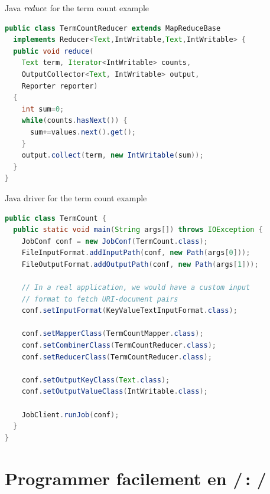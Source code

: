 \begin{frame}[fragile]{Java $\mathop{\mathit{reduce}}$ for the term count example}
\begin{lstlisting}[language=java]
public class TermCountReducer extends MapReduceBase
  implements Reducer<Text,IntWritable,Text,IntWritable> {
  public void reduce(
    Text term, Iterator<IntWritable> counts,
    OutputCollector<Text, IntWritable> output,
    Reporter reporter)
  {
    int sum=0;
    while(counts.hasNext()) {
      sum+=values.next().get();
    }
    output.collect(term, new IntWritable(sum));
  }
}
\end{lstlisting}
\end{frame}

\begin{frame}[fragile]{Java driver for the term count example}
\lstset{basicstyle=\footnotesize\ttfamily}
\begin{lstlisting}[language=java]
public class TermCount {
  public static void main(String args[]) throws IOException {
    JobConf conf = new JobConf(TermCount.class);
    FileInputFormat.addInputPath(conf, new Path(args[0]));
    FileOutputFormat.addOutputPath(conf, new Path(args[1]));

    // In a real application, we would have a custom input
    // format to fetch URI-document pairs
    conf.setInputFormat(KeyValueTextInputFormat.class);

    conf.setMapperClass(TermCountMapper.class);
    conf.setCombinerClass(TermCountReducer.class);
    conf.setReducerClass(TermCountReducer.class);

    conf.setOutputKeyClass(Text.class);
    conf.setOutputValueClass(IntWritable.class);

    JobClient.runJob(conf);
  }
}
\end{lstlisting}

\end{frame}

\section{Programmer facilement en \mapreduce/\,: \pig/}


